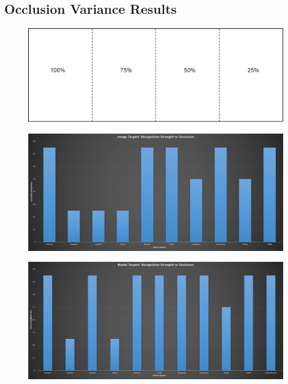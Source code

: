 \documentclass{aifyp}
\begin{document}
\begin{appendices}
\section{Occlusion Variance Results}
\begin{figure}[H]
    \centering
    \includegraphics[scale=0.7]{Images/Chapter6/ImageOcclusion.png}
    \label{fig:ImageOcclusionPercentages}
\end{figure}
\begin{figure}[H]
    \centering
    \includegraphics[scale=0.4]{Images/Chapter6/OcclusionImageTargetStrenghtBarChart.JPG}
    \label{fig:ImageTargetOcclusionBarchart}
\end{figure}
\begin{figure}[H]
    \centering
    \includegraphics[scale=0.4]{Images/Chapter6/OcclusionModelTargetStrenghtBarChart.JPG}
    \label{fig:ModelTargetOcclusionBarchart}
\end{figure}


\end{appendices}
\end{document}
